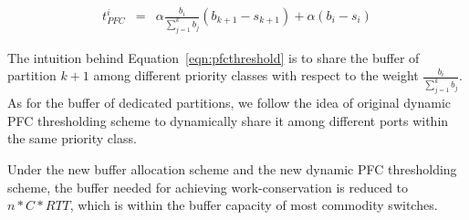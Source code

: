\begin{eqnarray} \label{eqn:pfcthreshold}
t^i_{PFC} &=& \alpha\frac{b_i}{\sum_{j=1}^k b_j} (b_{k+1}-s_{k+1}) + \alpha (b_i-s_i)
\end{eqnarray}

The intuition behind Equation~\ref{eqn:pfcthreshold} is to share the buffer of partition $k+1$ among different priority classes with respect to the weight $\frac{b_i}{\sum_{j=1}^k b_j}$. As for the buffer of dedicated partitions, we follow the idea of original dynamic PFC thresholding scheme to dynamically share it among different ports within the same priority class.

Under the new buffer allocation scheme and the new dynamic PFC thresholding scheme, the buffer needed for achieving work-conservation is reduced to 
$n*C*RTT$, which is within the buffer capacity of most commodity switches.
%
%
%
